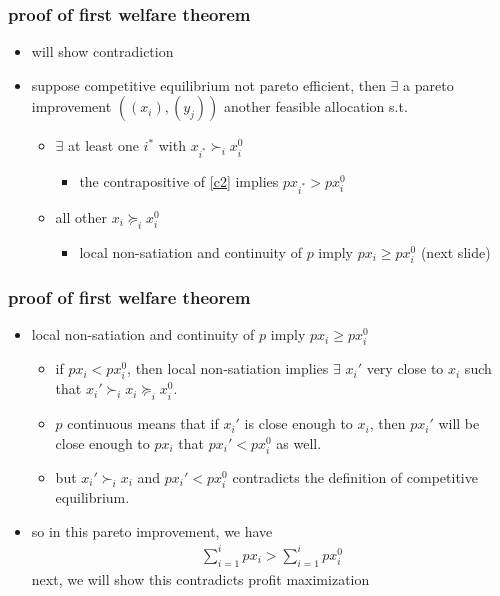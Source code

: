 \documentclass[compress]{beamer}
\newcommand{\prefeq}{\succeq}
\newcommand{\pref}{\succ}
\begin{document}
\begin{frame}
  \frametitle{proof of first welfare theorem}
  \begin{itemize}
  \item will show contradiction
  \item suppose competitive equilibrium not pareto efficient, then
    $\exists$ a pareto improvement $((x_i),(y_j))$ another feasible
    allocation s.t.
    \begin{itemize}
    \item $\exists $ at least one $i^*$ with $x_{i^*} \pref_i x_i^0$
      \begin{itemize}
      \item the contrapositive of \ref{c2} implies $p x_{i^*} > p
        x_i^0$
      \end{itemize}
    \item all other $x_i \prefeq_i x_i^0$ 
      \begin{itemize}
      \item local non-satiation and continuity of $p$ imply $p x_i
        \geq p x_i^0$  (next slide)
      \end{itemize}
    \end{itemize}
  \end{itemize}
\end{frame}

\begin{frame}
  \frametitle{proof of first welfare theorem}
  \begin{itemize}
  \item local non-satiation and continuity of $p$ imply $p x_i
    \geq p x_i^0$  
    \begin{itemize}
    \item if $p x_i < p x_i^0$, then local non-satiation implies
      $\exists$ $x_i'$ very close to $x_i$ such that $x_i' \pref_i x_i
      \prefeq_i x_i^0$. 
    \item $p$ continuous means that if $x_i'$ is close enough to
      $x_i$, then $p x_i'$ will be close enough to $p x_i$ that 
      $p x_i' < p x_i^0$ as well. 
    \item but $x_i' \pref_i x_i$ and $p x_i' < p x_i^0$ contradicts
      the definition of competitive equilibrium.
    \end{itemize}
  \item so in this pareto improvement, we have
    \begin{align}
     \sum_{i=1}^i p x_i > \sum_{i=1}^i p x_i^0
    \end{align}
    next, we will show this contradicts profit maximization
  \end{itemize}
\end{frame}
\end{document}
